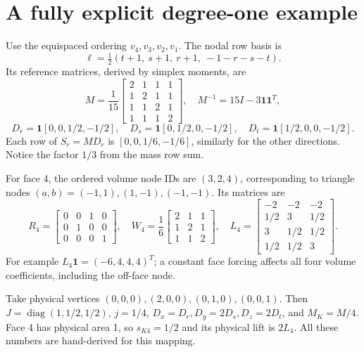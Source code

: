 \documentclass[11pt,a4paper]{article}
\begin{document}
\section{A fully explicit degree-one example}\label{sec:p1}
Use the equispaced ordering \(v_4,v_3,v_2,v_1\). The nodal row basis is
\begin{equation}
 \ell=\tfrac12(t+1,\ s+1,\ r+1,\ -1-r-s-t).
\end{equation}
Its reference matrices, derived by simplex moments, are
\begin{equation}\label{eq:p1mass}
 M=\frac1{15}\begin{bmatrix}2&1&1&1\\1&2&1&1\\1&1&2&1\\1&1&1&2\end{bmatrix},
 \quad M^{-1}=15I-3\mathbf1\mathbf1^T,
\end{equation}
\begin{equation}
 D_r=\mathbf1[0,0,1/2,-1/2],\quad
 D_s=\mathbf1[0,1/2,0,-1/2],\quad
 D_t=\mathbf1[1/2,0,0,-1/2].
\end{equation}
Each row of \(S_r=MD_r\) is \([0,0,1/6,-1/6]\), similarly for the other
directions. Notice the factor \(1/3\) from the mass row sum.

For face 4, the ordered volume node IDs are \((3,2,4)\), corresponding to
triangle nodes \((a,b)=(-1,1),(1,-1),(-1,-1)\). Its matrices are
\begin{equation}
 R_4=\begin{bmatrix}0&0&1&0\\0&1&0&0\\0&0&0&1\end{bmatrix},\quad
 W_4=\frac16\begin{bmatrix}2&1&1\\1&2&1\\1&1&2\end{bmatrix},\quad
 L_4=\begin{bmatrix}-2&-2&-2\\1/2&3&1/2\\3&1/2&1/2\\1/2&1/2&3\end{bmatrix}.
\end{equation}
For example \(L_4\mathbf1=(-6,4,4,4)^T\); a constant face forcing affects
all four volume coefficients, including the off-face node.

Take physical vertices \((0,0,0),(2,0,0),(0,1,0),(0,0,1)\). Then
\(J=\operatorname{diag}(1,1/2,1/2)\), \(j=1/4\),
\(D_x=D_r,D_y=2D_s,D_z=2D_t\), and \(M_K=M/4\).
Face 4 has physical area 1, so \(s_{K4}=1/2\) and its physical lift is
\(2L_4\). All these numbers are hand-derived for this mapping.
\end{document}
